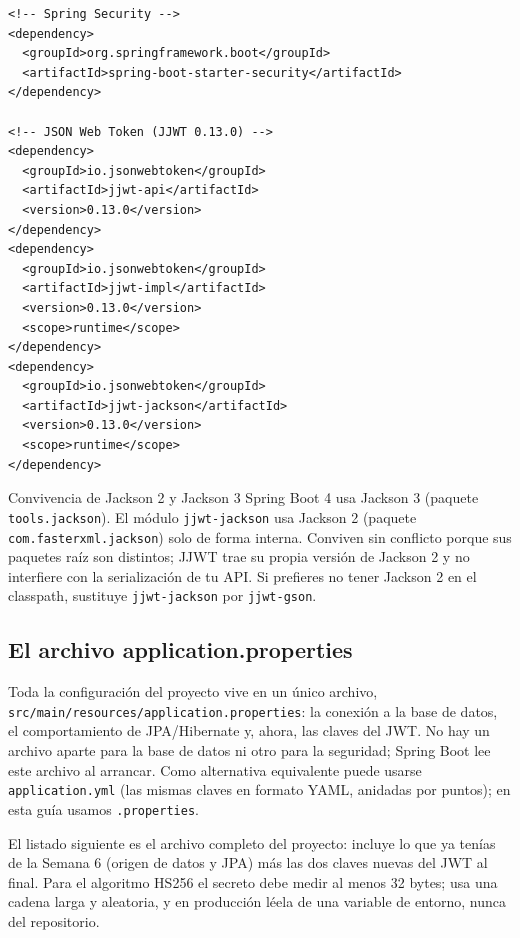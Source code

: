 \documentclass[11pt]{article}
\begin{document}
\begin{cajacodigo}
\begin{lstlisting}[style=xml]
<!-- Spring Security -->
<dependency>
  <groupId>org.springframework.boot</groupId>
  <artifactId>spring-boot-starter-security</artifactId>
</dependency>

<!-- JSON Web Token (JJWT 0.13.0) -->
<dependency>
  <groupId>io.jsonwebtoken</groupId>
  <artifactId>jjwt-api</artifactId>
  <version>0.13.0</version>
</dependency>
<dependency>
  <groupId>io.jsonwebtoken</groupId>
  <artifactId>jjwt-impl</artifactId>
  <version>0.13.0</version>
  <scope>runtime</scope>
</dependency>
<dependency>
  <groupId>io.jsonwebtoken</groupId>
  <artifactId>jjwt-jackson</artifactId>
  <version>0.13.0</version>
  <scope>runtime</scope>
</dependency>
\end{lstlisting}
\end{cajacodigo}

\begin{cajawarn}{Convivencia de Jackson 2 y Jackson 3}
Spring Boot 4 usa Jackson 3 (paquete \texttt{tools.\allowbreak{}jackson}). El módulo \texttt{jjwt-jackson} usa Jackson 2 (paquete \texttt{com.\allowbreak{}fasterxml.\allowbreak{}jackson}) solo de forma interna. Conviven sin conflicto porque sus paquetes raíz son distintos; JJWT trae su propia versión de Jackson 2 y no interfiere con la serialización de tu API. Si prefieres no tener Jackson 2 en el classpath, sustituye \texttt{jjwt-jackson} por \texttt{jjwt-gson}.\par
\end{cajawarn}

\subsection{El archivo application.properties}
Toda la configuración del proyecto vive en un único archivo, \texttt{src/\allowbreak{}main/\allowbreak{}resources/\allowbreak{}application.\allowbreak{}properties}: la conexión a la base de datos, el comportamiento de JPA/Hibernate y, ahora, las claves del JWT. No hay un archivo aparte para la base de datos ni otro para la seguridad; Spring Boot lee este archivo al arrancar. Como alternativa equivalente puede usarse \texttt{application.yml} (las mismas claves en formato YAML, anidadas por puntos); en esta guía usamos \texttt{.properties}.

El listado siguiente es el archivo completo del proyecto: incluye lo que ya tenías de la Semana 6 (origen de datos y JPA) más las dos claves nuevas del JWT al final. Para el algoritmo HS256 el secreto debe medir al menos 32 bytes; usa una cadena larga y aleatoria, y en producción léela de una variable de entorno, nunca del repositorio.
\end{document}
